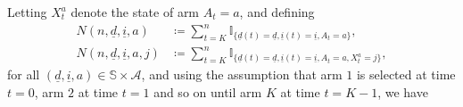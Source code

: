 Letting $X_t^a$ denote the state of arm $A_t=a$, and defining
\begin{align}
	N(n,\underline{d},\underline{i},a)&\coloneqq\sum\limits_{t=K}^{n}\mathbb{I}_{\{\underline{d}(t)=\underline{d},\underline{i}(t)=\underline{i},A_t=a\}},\label{restless_with_known_eq:N(n,d,i,a)}\\
	N(n,\underline{d},\underline{i},a,j)&\coloneqq \sum\limits_{t=K}^{n}\mathbb{I}_{\{\underline{d}(t)=\underline{d},\underline{i}(t)=\underline{i},A_t=a,X_t^a=j\}},\label{restless_with_known_eq:N(n,d,i,a,j)}
\end{align}
for all $(\underline{d},\underline{i},a)\in\mathbb{S}\times\mathcal{A}$, and using the assumption that arm $1$ is selected at time $t=0$, arm $2$ at time $t=1$ and so on until arm $K$ at time $t=K-1$, we have
